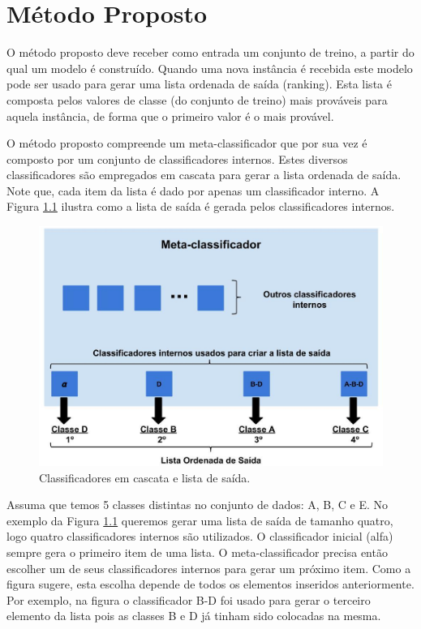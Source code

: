 \chapter{Método Proposto}

O método proposto deve receber como entrada um conjunto de treino, a partir do qual um modelo é construído. Quando uma nova instância é recebida este modelo pode ser usado para gerar uma lista ordenada de saída (ranking). Esta lista é composta pelos valores de classe (do conjunto de treino) mais prováveis para aquela instância, de forma que o primeiro valor é o mais provável. 

O método proposto compreende um meta-classificador que por sua vez é composto por um conjunto de classificadores internos. Estes diversos classificadores são empregados em cascata para gerar a lista ordenada de saída. Note que, cada item da lista é dado por apenas um classificador interno. A Figura \ref{fig:metodoproposto01} ilustra como a lista de saída é gerada pelos classificadores internos.

\begin{figure}[h!]
  \includegraphics[width=\linewidth]{images/metodoproposto01.eps}
  \caption{Classificadores em cascata e lista de saída.}
  \label{fig:metodoproposto01}
\end{figure}

Assuma que temos 5 classes distintas no conjunto de dados: A, B, C e E. No exemplo da Figura \ref{fig:metodoproposto01} queremos gerar uma lista de saída de tamanho quatro, logo quatro classificadores internos são utilizados. O classificador inicial (alfa) sempre gera o primeiro item de uma lista. O meta-classificador precisa então escolher um de seus classificadores internos para gerar um próximo item. Como a figura sugere, esta escolha depende de todos os elementos inseridos anteriormente. Por exemplo, na figura o classificador B-D foi usado para gerar o terceiro elemento da lista pois as classes B e D já tinham sido colocadas na mesma.

